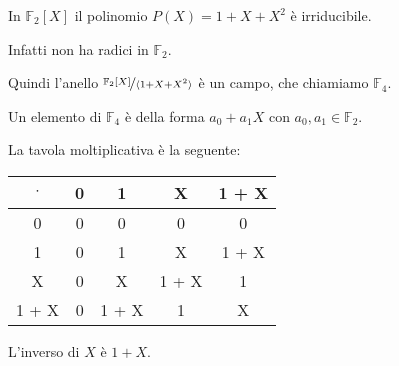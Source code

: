 \documentclass[../main.tex]{subfiles}
\begin{document}
\begin{example}
    In $\mathbb{F}_2[X]$ il polinomio $P(X) = 1 + X + X^2$ è irriducibile.

    Infatti non ha radici in $\mathbb{F}_2$.

    Quindi l'anello $\nicefrac{\mathbb{F}_2[X]}{\langle1 + X + X^2\rangle}$ è un campo, che chiamiamo $\mathbb{F}_4$.

    Un elemento di $\mathbb{F}_4$ è della forma $a_0 + a_1X$ con $a_0,a_1 \in \mathbb{F}_2$.

    La tavola moltiplicativa è la seguente:
    \begin{center}
        \begin{tabular}{c|c|c|c|c}
            $\cdot$ & 0 & 1     & X     & 1 + X \\
            \hline
            0       & 0 & 0     & 0     & 0     \\
            \hline
            1       & 0 & 1     & X     & 1 + X \\
            \hline
            X       & 0 & X     & 1 + X & 1     \\
            \hline
            1 + X   & 0 & 1 + X & 1     & X     \\
        \end{tabular}
    \end{center}
    L'inverso di $X$ è $1 + X$.
\end{example}
\end{document}
